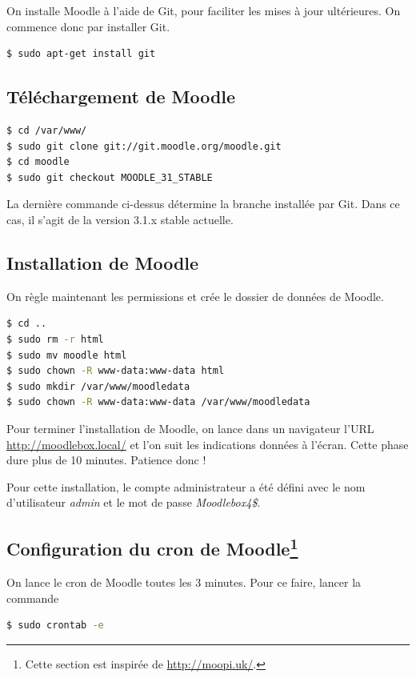 \documentclass[11pt]{article}
\begin{document}
On installe Moodle à l'aide de Git, pour faciliter les mises à jour ultérieures. On commence donc par installer Git.

\begin{lstlisting}[language=bash]
$ sudo apt-get install git
\end{lstlisting}

\subsection{Téléchargement de Moodle}

\begin{lstlisting}[language=bash]
$ cd /var/www/
$ sudo git clone git://git.moodle.org/moodle.git
$ cd moodle
$ sudo git checkout MOODLE_31_STABLE
\end{lstlisting}
La dernière commande ci-dessus détermine la branche installée par Git. Dans ce cas, il s'agit de la version 3.1.x stable actuelle.

\subsection{Installation de Moodle}

On règle maintenant les permissions et crée le dossier de données de Moodle.
\begin{lstlisting}[language=bash]
$ cd ..
$ sudo rm -r html
$ sudo mv moodle html
$ sudo chown -R www-data:www-data html
$ sudo mkdir /var/www/moodledata
$ sudo chown -R www-data:www-data /var/www/moodledata
\end{lstlisting}

Pour terminer l'installation de Moodle, on lance dans un navigateur l'URL \url{http://moodlebox.local/} et l'on suit les indications données à l'écran. Cette phase dure plus de 10 minutes. Patience donc !

Pour cette installation, le compte administrateur a été défini avec le nom d'utilisateur \emph{admin} et le mot de passe \emph{Moodlebox4\$}.

\subsection[Configuration du cron de Moodle]{Configuration du cron de Moodle\footnote{Cette section est inspirée de \url{http://moopi.uk/}.}}

On lance le cron de Moodle toutes les 3 minutes. Pour ce faire, lancer la commande

\begin{lstlisting}[language=bash]
$ sudo crontab -e
\end{lstlisting}
\end{document}
